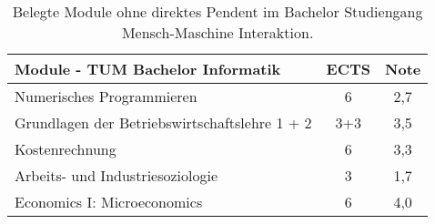 \documentclass[11pt, a4paper]{awesome-cv}
\begin{document}
\begin{table*}
  \scriptsize
  \centering
  \begin{tabularx}{.5\textwidth}{|X|c|c|}
    \hline
    Module - TUM Bachelor Informatik              & ECTS & Note \\
    \hline

    Numerisches Programmieren                     & 6    & 2,7  \\

    \rowcolor{awesome!25}
    Grundlagen der Betriebswirtschaftslehre 1 + 2 & 3+3  & 3,5  \\

    Kostenrechnung                                & 6    & 3,3  \\

    \rowcolor{awesome!25}
    Arbeits- und Industriesoziologie              & 3    & 1,7  \\

    Economics I: Microeconomics                   & 6    & 4,0  \\
    \hline
  \end{tabularx}
  \label{table:2}
  \caption{Belegte Module ohne direktes Pendent im Bachelor Studiengang Mensch-Maschine Interaktion.}
\end{table*}
\end{document}

